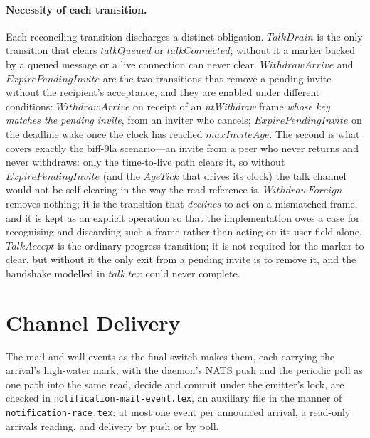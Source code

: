 \documentclass[a4paper,10pt,fleqn]{article}
\begin{document}
\paragraph{Necessity of each transition.}  Each reconciling transition
discharges a distinct obligation.  $TalkDrain$ is the only transition
that clears $talkQueued$ or $talkConnected$; without it a marker backed
by a queued message or a live connection can never clear.
$WithdrawArrive$ and $ExpirePendingInvite$ are the two transitions that
remove a pending invite without the recipient's acceptance, and they are
enabled under different conditions: $WithdrawArrive$ on receipt of an
\emph{ntWithdraw} frame \emph{whose key matches the pending invite}, from an
inviter who cancels; $ExpirePendingInvite$ on the deadline wake once the clock
has reached $maxInviteAge$.  The second is
what covers exactly the biff-9la scenario---an invite from a peer who
never returns and never withdraws: only the time-to-live path clears it,
so without $ExpirePendingInvite$ (and the $AgeTick$ that drives its
clock) the talk channel would not be self-clearing in the way the read
reference is.  $WithdrawForeign$ removes nothing; it is the transition that
\emph{declines} to act on a mismatched frame, and it is kept as an explicit
operation so that the implementation owes a case for recognising and
discarding such a frame rather than acting on its user field alone.
$TalkAccept$ is the ordinary progress transition; it is not
required for the marker to clear, but without it the only exit from a
pending invite is to remove it, and the handshake modelled in $talk.tex$
could never complete.

\section{Channel Delivery}

The mail and wall events as the final switch makes them, each carrying the
arrival's high-water mark, with the daemon's NATS push and the periodic poll as
one path into the same read, decide and commit under the emitter's lock, are
checked in \texttt{notification-mail-event.tex}, an auxiliary file in the manner
of \texttt{notification-race.tex}: at most one event per announced arrival, a
read-only arrivals reading, and delivery by push or by poll.
\label{sec:channel}
\end{document}
